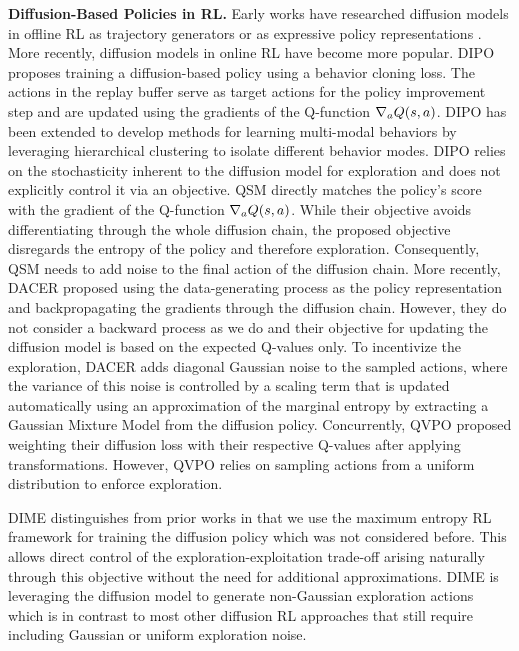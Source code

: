 \textbf{Diffusion-Based Policies in RL.} Early works have researched diffusion models in offline RL \cite{lange2012batch, levine2020offline} as trajectory generators \cite{janner2022planning} or as expressive policy representations \cite{wang2023diffusion, kang2024efficient, hansen2023idql, chenoffline,dingconsistency}. 
More recently, diffusion models in online RL have become more popular. 
DIPO \cite{yang2023policy} proposes training a diffusion-based policy using a behavior cloning loss. The actions in the replay buffer serve as target actions for the policy improvement step and are updated using the gradients of the Q-function $\nabla_{a}Q(s,a)$. DIPO has been extended to develop methods for learning multi-modal behaviors\cite{li2024learning} by leveraging hierarchical clustering to isolate different behavior modes. DIPO relies on the stochasticity inherent to the diffusion model for exploration and does not explicitly control it via an objective. QSM \cite{psenkalearning} directly matches the policy's score with the gradient of the Q-function $\nabla_{a}Q(s, a)$. While their objective avoids differentiating through the whole diffusion chain, the proposed objective disregards the entropy of the policy and therefore exploration. Consequently, QSM needs to add noise to the final action of the diffusion chain. 
More recently, DACER \cite{wang2024diffusion} proposed using the data-generating process as the policy representation and backpropagating the gradients through the diffusion chain. 
However, they do not consider a backward process as we do and their objective for updating the diffusion model is based on the expected Q-values only. 
To incentivize the exploration, DACER adds diagonal Gaussian noise to the sampled actions, where the variance of this noise is controlled by a scaling term that is updated automatically using an approximation of the marginal entropy by extracting a Gaussian Mixture Model from the diffusion policy. 
Concurrently, QVPO \cite{ding2024diffusionbased} proposed weighting their diffusion loss with their respective Q-values after applying transformations. 
However, QVPO relies on sampling actions from a uniform distribution to enforce exploration. 

DIME distinguishes from prior works in that we use the maximum entropy RL framework for training the diffusion policy which was not considered before. This allows direct control of the exploration-exploitation trade-off arising naturally through this objective without the need for additional approximations. DIME is leveraging the diffusion model to generate non-Gaussian exploration actions which is in contrast to most other diffusion RL approaches that still require including Gaussian or uniform exploration noise. 

